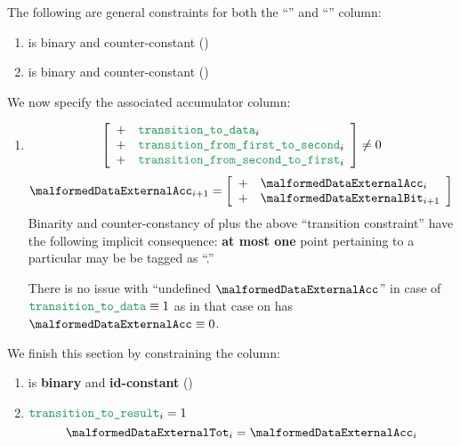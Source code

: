 The following are general constraints for both the ``'' and ``'' column:
\begin{enumerate}[resume]
    \item \malformedDataExternalBit{} is binary and counter-constant \quad (\trash)
    \item \malformedDataExternalAcc{} is binary and counter-constant \quad (\trash)
\end{enumerate}
We now specify the associated accumulator column:
\begin{enumerate}[resume]
    \item \If
        \[
            \left[ \begin{array}{cl}
                + & \locTransitionToData            _{i} \\
                + & \locTransitionFromFirstToSecond _{i} \\
                + & \locTransitionFromSecondToFirst _{i} \\
            \end{array} \right]
            \neq 0
        \]
        \Then
        \[
            \malformedDataExternalAcc _{i + 1} =
            \left[ \begin{array}{cl}
                + & \malformedDataExternalAcc _{i}     \\
                + & \malformedDataExternalBit _{i + 1} \\
            \end{array} \right]
        \]
        \saNote{}
        Binarity and counter-constancy of \malformedDataExternalAcc{}
        plus the above ``transition constraint''
        have the following implicit consequence:
        \textbf{at most one} point pertaining to a particular \blsId{} may be be tagged as ``\malformedDataExternalBit.''

        \saNote{}
        There is no issue with ``undefined $\malformedDataExternalAcc$'' in case of $\locTransitionToData \equiv 1$
        as in that case on has $\malformedDataExternalAcc \equiv 0$.
\end{enumerate}
We finish this section by constraining the \malformedDataExternalTot{} column:
\begin{enumerate}[resume]
    \item \malformedDataExternalTot{} is \textbf{binary} and \textbf{id-constant} \quad (\trash)
    \item \If $\locTransitionToResult_{i} = 1$ \Then
        \[
            \malformedDataExternalTot_{i} = \malformedDataExternalAcc _{i}
        \]
\end{enumerate}
